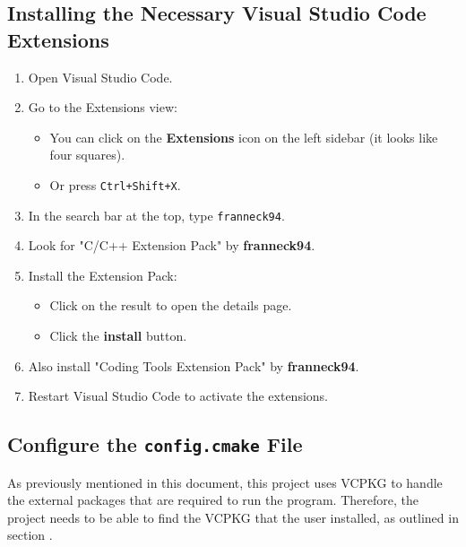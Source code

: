 \documentclass{article}
\begin{document}
\vspace{10pt}

\subsection{Installing the Necessary Visual Studio Code Extensions}
\begin{enumerate}
    \item Open Visual Studio Code.
    
    \item Go to the Extensions view:
    \begin{itemize}
        \item You can click on the \textbf{Extensions} icon on the left sidebar (it looks like four squares).
        \item Or press \texttt{Ctrl+Shift+X}.
    \end{itemize}
    
    \item In the search bar at the top, type \texttt{franneck94}.
    
    \item Look for "C/C++ Extension Pack" by \textbf{franneck94}.

    \item Install the Extension Pack:
    \begin{itemize}
        \item Click on the result to open the details page.
        \item Click the \textbf{install} button.
    \end{itemize}

    \item Also install "Coding Tools Extension Pack" by \textbf{franneck94}.

    \item Restart Visual Studio Code to activate the extensions.

\end{enumerate}

\subsection{Configure the \texttt{config.cmake} File}
As previously mentioned in this document, this project uses VCPKG to handle the external packages that are required to run the program. Therefore, the project needs to be able to find the VCPKG that the user installed, as outlined in section \textbf{}.
\end{document}
